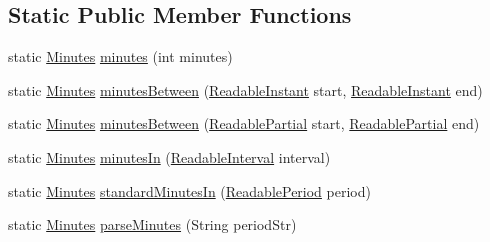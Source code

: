 \subsection*{Static Public Member Functions}
\begin{DoxyCompactItemize}
\item 
static \hyperlink{classorg_1_1joda_1_1time_1_1_minutes}{Minutes} \hyperlink{classorg_1_1joda_1_1time_1_1_minutes_ac0a4591486b2223d24ce0519e8643aca}{minutes} (int minutes)
\item 
static \hyperlink{classorg_1_1joda_1_1time_1_1_minutes}{Minutes} \hyperlink{classorg_1_1joda_1_1time_1_1_minutes_ad8fc069317b7a2424e5e0afdabf18520}{minutes\-Between} (\hyperlink{interfaceorg_1_1joda_1_1time_1_1_readable_instant}{Readable\-Instant} start, \hyperlink{interfaceorg_1_1joda_1_1time_1_1_readable_instant}{Readable\-Instant} end)
\item 
static \hyperlink{classorg_1_1joda_1_1time_1_1_minutes}{Minutes} \hyperlink{classorg_1_1joda_1_1time_1_1_minutes_abe409f6dc7b491154b1d76d1e10ff1de}{minutes\-Between} (\hyperlink{interfaceorg_1_1joda_1_1time_1_1_readable_partial}{Readable\-Partial} start, \hyperlink{interfaceorg_1_1joda_1_1time_1_1_readable_partial}{Readable\-Partial} end)
\item 
static \hyperlink{classorg_1_1joda_1_1time_1_1_minutes}{Minutes} \hyperlink{classorg_1_1joda_1_1time_1_1_minutes_a22568753f47ff8fec7a453be740e732b}{minutes\-In} (\hyperlink{interfaceorg_1_1joda_1_1time_1_1_readable_interval}{Readable\-Interval} interval)
\item 
static \hyperlink{classorg_1_1joda_1_1time_1_1_minutes}{Minutes} \hyperlink{classorg_1_1joda_1_1time_1_1_minutes_a216a6428f20a73ca6b710a4510e98448}{standard\-Minutes\-In} (\hyperlink{interfaceorg_1_1joda_1_1time_1_1_readable_period}{Readable\-Period} period)
\item 
static \hyperlink{classorg_1_1joda_1_1time_1_1_minutes}{Minutes} \hyperlink{classorg_1_1joda_1_1time_1_1_minutes_a40e49d1d8c15227c16aca24a7ed887d9}{parse\-Minutes} (String period\-Str)
\end{DoxyCompactItemize}
